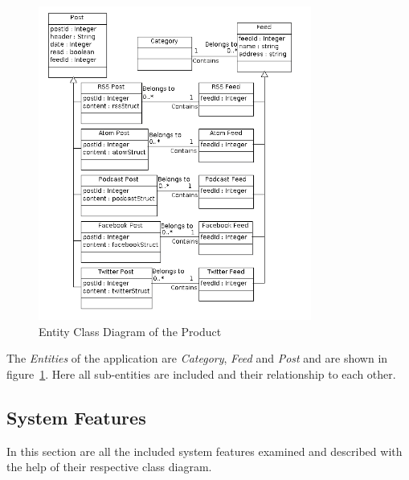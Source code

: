 \begin{figure}[hbt]
\centering
\includegraphics[width=0.8\textwidth]{./images/EntityClassDiagram.png}
\caption{Entity Class Diagram of the Product}
\label{fig:entity}
\end{figure}
The \textit{Entities} of the application are \textit{Category}, \textit{Feed} and \textit{Post} and are shown in figure~\ref{fig:entity}. Here all sub-entities are included and their relationship to each other.

\newpage
\subsection{System Features}
\label{sec:system_features}
In this section are all the included system features examined and described with the help of their respective class diagram.


